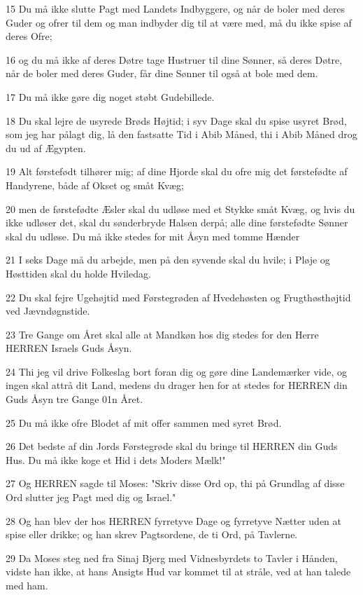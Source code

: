 \par 15 Du må ikke slutte Pagt med Landets Indbyggere, og når de boler med deres Guder og ofrer til dem og man indbyder dig til at være med, må du ikke spise af deres Ofre;
\par 16 og du må ikke af deres Døtre tage Hustruer til dine Sønner, så deres Døtre, når de boler med deres Guder, får dine Sønner til også at bole med dem.
\par 17 Du må ikke gøre dig noget støbt Gudebillede.
\par 18 Du skal lejre de usyrede Brøds Højtid; i syv Dage skal du spise usyret Brød, som jeg har pålagt dig, lå den fastsatte Tid i Abib Måned, thi i Abib Måned drog du ud af Ægypten.
\par 19 Alt førstefødt tilhører mig; af dine Hjorde skal du ofre mig det førstefødte af Handyrene, både af Okset og småt Kvæg;
\par 20 men de førstefødte Æsler skal du udløse med et Stykke småt Kvæg, og hvis du ikke udløser det, skal du sønderbryde Halsen derpå; alle dine førstefødte Sønner skal du udløse. Du må ikke stedes for mit Åsyn med tomme Hænder
\par 21 I seks Dage må du arbejde, men på den syvende skal du hvile; i Pløje og Høsttiden skal du holde Hviledag.
\par 22 Du skal fejre Ugehøjtid med Førstegrøden af Hvedehøsten og Frugthøsthøjtid ved Jævndøgnstide.
\par 23 Tre Gange om Året skal alle at Mandkøn hos dig stedes for den Herre HERREN Israels Guds Åsyn.
\par 24 Thi jeg vil drive Folkeslag bort foran dig og gøre dine Landemærker vide, og ingen skal attrå dit Land, medens du drager hen for at stedes for HERREN din Guds Åsyn tre Gange 01n Året.
\par 25 Du må ikke ofre Blodet af mit offer sammen med syret Brød.
\par 26 Det bedste af din Jords Førstegrøde skal du bringe til HERREN din Guds Hus. Du må ikke koge et Hid i dets Moders Mælk!"
\par 27 Og HERREN sagde til Moses: "Skriv disse Ord op, thi på Grundlag af disse Ord slutter jeg Pagt med dig og Israel."
\par 28 Og han blev der hos HERREN fyrretyve Dage og fyrretyve Nætter uden at spise eller drikke; og han skrev Pagtsordene, de ti Ord, på Tavlerne.
\par 29 Da Moses steg ned fra Sinaj Bjerg med Vidnesbyrdets to Tavler i Hånden, vidste han ikke, at hans Ansigts Hud var kommet til at stråle, ved at han talede med ham.
